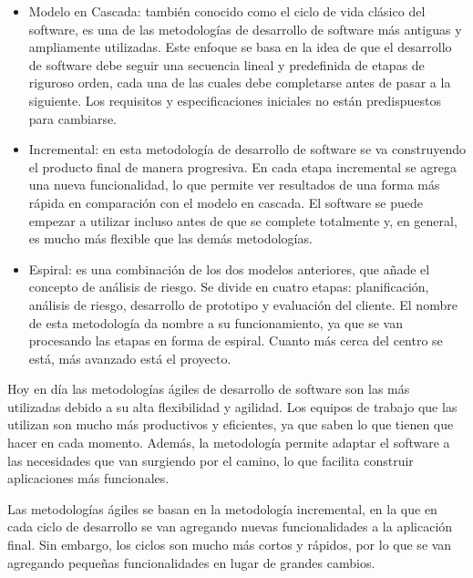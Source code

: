 {    
    \begin{itemize}
    	\item Modelo en Cascada: también conocido como el ciclo de vida clásico del software, es una de las metodologías de desarrollo de software más antiguas y ampliamente utilizadas. Este enfoque se basa en la idea de que el desarrollo de software debe seguir una secuencia lineal y predefinida de etapas de riguroso orden, cada una de las cuales debe completarse antes de pasar a la siguiente. Los requisitos y especificaciones iniciales no están predispuestos para cambiarse.
    	\item Incremental: en esta metodología de desarrollo de software se va construyendo el producto final de manera progresiva. En cada etapa incremental se agrega una nueva funcionalidad, lo que permite ver resultados de una forma más rápida en comparación con el modelo en cascada. El software se puede empezar a utilizar incluso antes de que se complete totalmente y, en general, es mucho más flexible que las demás metodologías.
    	\item Espiral: es una combinación de los dos modelos anteriores, que añade el concepto de análisis de riesgo. Se divide en cuatro etapas: planificación, análisis de riesgo, desarrollo de prototipo y evaluación del cliente. El nombre de esta metodología da nombre a su funcionamiento, ya que se van procesando las etapas en forma de espiral. Cuanto más cerca del centro se está, más avanzado está el proyecto.
    \end{itemize}
    
    
    Hoy en día las metodologías ágiles de desarrollo de software son las más utilizadas debido a su alta flexibilidad y agilidad. Los equipos de trabajo que las utilizan son mucho más productivos y eficientes, ya que saben lo que tienen que hacer en cada momento. Además, la metodología permite adaptar el software a las necesidades que van surgiendo por el camino, lo que facilita construir aplicaciones más funcionales.
    
    Las metodologías ágiles se basan en la metodología incremental, en la que en cada ciclo de desarrollo se van agregando nuevas funcionalidades a la aplicación final. Sin embargo, los ciclos son mucho más cortos y rápidos, por lo que se van agregando pequeñas funcionalidades en lugar de grandes cambios.
    
}
